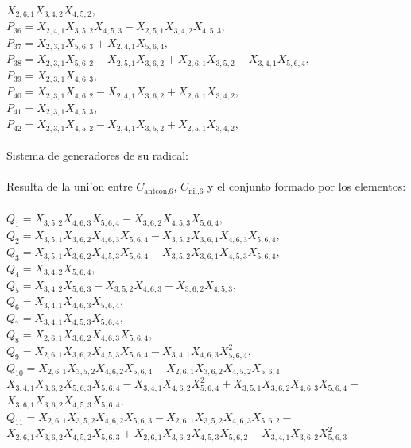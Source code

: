 \documentclass[10pt]{beamer}
\begin{document}
{$X_{2,6,1}X_{3,4,2}X_{4,5,2},$\\
$P_{36}=X_{2,4,1}X_{3,5,2}X_{4,5,3}-X_{2,5,1}X_{3,4,2}X_{4,5,3},$\\
$P_{37}=X_{2,3,1}X_{5,6,3}+X_{2,4,1}X_{5,6,4},$\\
$P_{38}=X_{2,3,1}X_{5,6,2}-X_{2,5,1}X_{3,6,2}+X_{2,6,1}X_{3,5,2}-X_{3,4,1}X_{5,6,4},$\\
$P_{39}=X_{2,3,1}X_{4,6,3},$\\
$P_{40}=X_{2,3,1}X_{4,6,2}-X_{2,4,1}X_{3,6,2}+X_{2,6,1}X_{3,4,2},$\\
$P_{41}=X_{2,3,1}X_{4,5,3},$\\
$P_{42}=X_{2,3,1}X_{4,5,2}-X_{2,4,1}X_{3,5,2}+X_{2,5,1}X_{3,4,2},$\\
\\
Sistema de generadores de su radical:\\
\\
Resulta de la uni'on entre $C_{\text{antcon,}6}$, $C_{\text{nil,}6}$ y el conjunto formado por los elementos:\\
\\ 
$Q_{1}=X_{3,5,2}X_{4,6,3}X_{5,6,4}-X_{3,6,2}X_{4,5,3}X_{5,6,4},$\\
$Q_{2}=X_{3,5,1}X_{3,6,2}X_{4,6,3}X_{5,6,4}-X_{3,5,2}X_{3,6,1}X_{4,6,3}X_{5,6,4},$\\
$Q_{3}=X_{3,5,1}X_{3,6,2}X_{4,5,3}X_{5,6,4}-X_{3,5,2}X_{3,6,1}X_{4,5,3}X_{5,6,4},$\\
$Q_{4}=X_{3,4,2}X_{5,6,4},$\\
$Q_{5}=X_{3,4,2}X_{5,6,3}-X_{3,5,2}X_{4,6,3}+X_{3,6,2}X_{4,5,3},$\\
$Q_{6}=X_{3,4,1}X_{4,6,3}X_{5,6,4},$\\
$Q_{7}=X_{3,4,1}X_{4,5,3}X_{5,6,4},$\\
$Q_{8}=X_{2,6,1}X_{3,6,2}X_{4,6,3}X_{5,6,4},$\\
$Q_{9}=X_{2,6,1}X_{3,6,2}X_{4,5,3}X_{5,6,4}-X_{3,4,1}X_{4,6,3}X_{5,6,4}^2,$\\
$Q_{10}=X_{2,6,1}X_{3,5,2}X_{4,6,2}X_{5,6,4}-X_{2,6,1}X_{3,6,2}X_{4,5,2}X_{5,6,4}-$\\
$X_{3,4,1}X_{3,6,2}X_{5,6,3}X_{5,6,4}-X_{3,4,1}X_{4,6,2}X_{5,6,4}^2+X_{3,5,1}X_{3,6,2}X_{4,6,3}X_{5,6,4}-$\\
$X_{3,6,1}X_{3,6,2}X_{4,5,3}X_{5,6,4},$\\
$Q_{11}=X_{2,6,1}X_{3,5,2}X_{4,6,2}X_{5,6,3}-X_{2,6,1}X_{3,5,2}X_{4,6,3}X_{5,6,2}-$\\
$X_{2,6,1}X_{3,6,2}X_{4,5,2}X_{5,6,3}+X_{2,6,1}X_{3,6,2}X_{4,5,3}X_{5,6,2}-X_{3,4,1}X_{3,6,2}X_{5,6,3}^2-$\\
}
\end{document}
